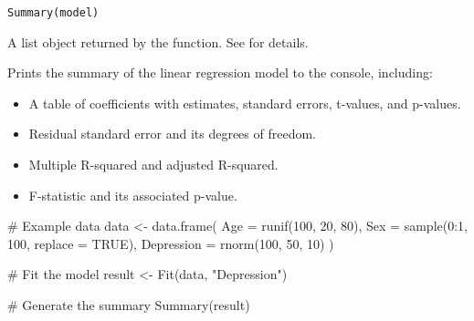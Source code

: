\documentclass[a4paper]{book}
\begin{document}
%
\begin{Usage}
\begin{verbatim}
Summary(model)
\end{verbatim}
\end{Usage}
%
\begin{Arguments}
\begin{ldescription}
\item[\code{model}] A list object returned by the  function. See  for details.
\end{ldescription}
\end{Arguments}
%
\begin{Value}
Prints the summary of the linear regression model to the console, including:
\begin{itemize}

\item{} A table of coefficients with estimates, standard errors, t-values, and p-values.
\item{} Residual standard error and its degrees of freedom.
\item{} Multiple R-squared and adjusted R-squared.
\item{} F-statistic and its associated p-value.

\end{itemize}

\end{Value}
%
\begin{Examples}
\begin{ExampleCode}
# Example data
data <- data.frame(
  Age = runif(100, 20, 80),
  Sex = sample(0:1, 100, replace = TRUE),
  Depression = rnorm(100, 50, 10)
)

# Fit the model
result <- Fit(data, "Depression")

# Generate the summary
Summary(result)
\end{ExampleCode}
\end{Examples}
\printindex{}
\end{document}
